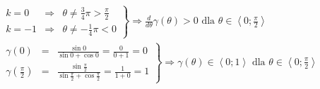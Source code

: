        	\begin{align*}
       		\left. \begin{array}{rcl}
       		 k = 0 & \Rightarrow & \theta \neq \frac{3}{4}\pi > \frac{\pi}{2}  \\
    	 	 k = -1 & \Rightarrow &\theta \neq -\frac{1}{4}\pi < 0
    	 	\end{array}    \right\}\Rightarrow \frac{d}{d\theta}\gamma\left( \theta\right) > 0 \text{ dla } \theta \in \left\langle 0;\frac{\pi}{2}\right\rangle& \hspace{10cm}
        \end{align*}
       	\begin{align*}
       	\left. \begin{array}{rcl}
       		\gamma\left( 0\right) & = &\frac{\sin 0}{\sin 0 + \cos 0} = \frac{0}{0 + 1} = 0\\	
       		\gamma\left( \frac{\pi}{2}\right) & = &\frac{\sin  \frac{\pi}{2}}{\sin  \frac{\pi}{2} + \cos  \frac{\pi}{2}} = \frac{1}{1 + 0}= 1
       	\end{array} \right\} \Rightarrow \gamma\left( \theta\right) \in \left\langle 0;1\right\rangle \text{ dla } \theta \in \left\langle 0;\frac{\pi}{2}\right\rangle& \hspace{10cm}
        \end{align*}